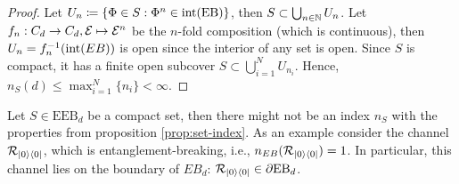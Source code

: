 \begin{proof}
    Let $U_n\coloneqq \{\Phi \in S: \Phi^n \in \mathrm{int}(\text{EB})\}$, then $S \subset \bigcup_{n\in \mathbb{N}}U_n$. Let $f_n:C_d \rightarrow C_d, \mathcal E \mapsto \mathcal E^n$ be the $n$-fold composition (which is continuous), then $U_n = f_n^{-1}(\mathrm{int}(EB))$ is open since the interior of any set is open. Since $S$ is compact, it has a finite open subcover $S \subset \bigcup_{i=1}^N U_{n_i}$. Hence, $n_S(d) \leq \max_{i=1}^N \{n_i\}< \infty$.
\end{proof}
\begin{ex}
    Let $S \in \text{EEB}_d$ be a compact set, then there might not be an index $n_S$ with the properties from proposition \ref{prop:set-index}. As an example consider the channel $\mathcal R_{\lvert0\rangle\langle0\rvert}$, which is entanglement-breaking, i.e., $n_{EB}(\mathcal R_{\lvert0\rangle\langle0\rvert})=1$. In particular, this channel lies on the boundary of $EB_d$: $\mathcal R_{\lvert0\rangle\langle0\rvert} \in \partial \text{EB}_d$.
\end{ex}
